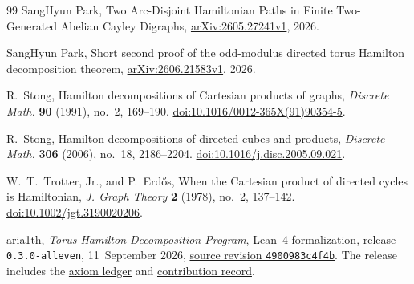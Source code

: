 \documentclass[11pt,reqno]{amsart}
\numberwithin{equation}{section}
\theoremstyle{definition}
\theoremstyle{remark}
\newcommand{\arxivref}[1]{\href{https://arxiv.org/abs/#1}{arXiv:#1}}
\newcommand{\doiref}[1]{\href{https://doi.org/#1}{doi:#1}}
\begin{document}
\begin{thebibliography}{99}
SangHyun Park,
Two Arc-Disjoint Hamiltonian Paths in Finite Two-Generated Abelian Cayley Digraphs,
\arxivref{2605.27241v1}, 2026.

SangHyun Park,
Short second proof of the odd-modulus directed torus Hamilton decomposition theorem,
\arxivref{2606.21583v1}, 2026.

R.~Stong,
Hamilton decompositions of Cartesian products of graphs,
\emph{Discrete Math.} \textbf{90} (1991), no.~2, 169--190.
\doiref{10.1016/0012-365X(91)90354-5}.

R.~Stong,
Hamilton decompositions of directed cubes and products,
\emph{Discrete Math.} \textbf{306} (2006), no.~18, 2186--2204.
\doiref{10.1016/j.disc.2005.09.021}.

W.~T.~Trotter, Jr., and P.~Erd\H{o}s,
When the Cartesian product of directed cycles is Hamiltonian,
\emph{J. Graph Theory} \textbf{2} (1978), no.~2, 137--142.
\doiref{10.1002/jgt.3190020206}.

aria1th,
\emph{Torus Hamilton Decomposition Program},
Lean~4 formalization, release \texttt{0.3.0-alleven}, 11~September 2026,
\href{https://github.com/aria1th/Torus-Hamilton-Decomposition-Program/tree/4900983c4f4be61ed90b008c6063cddd6c91d4e2}{source revision \texttt{4900983c4f4b}}.
The release includes the
\href{https://github.com/aria1th/Torus-Hamilton-Decomposition-Program/blob/4900983c4f4be61ed90b008c6063cddd6c91d4e2/docs/EVEN_AXIOM_LEDGER.md}{axiom ledger} and
\href{https://github.com/aria1th/Torus-Hamilton-Decomposition-Program/blob/4900983c4f4be61ed90b008c6063cddd6c91d4e2/docs/CONTRIBUTIONS.md}{contribution record}.

\end{thebibliography}
\end{document}
